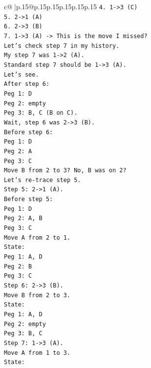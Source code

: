 \documentclass{article}
\begin{document}
{\begin{supertabular}{c@{$\;$}|p{.15\linewidth}@{}p{.15\linewidth}p{.15\linewidth}p{.15\linewidth}p{.15\linewidth}p{.15\linewidth}}
{{{\texttt{4. 1{-}>3 (C)} \\
\texttt{5. 2{-}>1 (A)} \\
\texttt{6. 2{-}>3 (B)} \\
\texttt{7. 1{-}>3 (A) {-}> This is the move I missed?} \\
\texttt{Let's check step 7 in my history.} \\
\texttt{My step 7 was 1{-}>2 (A).} \\
\texttt{Standard step 7 should be 1{-}>3 (A).} \\
\texttt{Let's see.} \\
\texttt{After step 6:} \\
\texttt{Peg 1: D} \\
\texttt{Peg 2: empty} \\
\texttt{Peg 3: B, C (B on C).} \\
\texttt{Wait, step 6 was 2{-}>3 (B).} \\
\texttt{Before step 6:} \\
\texttt{Peg 1: D} \\
\texttt{Peg 2: A} \\
\texttt{Peg 3: C} \\
\texttt{Move B from 2 to 3? No, B was on 2?} \\
\texttt{Let's re{-}trace step 5.} \\
\texttt{Step 5: 2{-}>1 (A).} \\
\texttt{Before step 5:} \\
\texttt{Peg 1: D} \\
\texttt{Peg 2: A, B} \\
\texttt{Peg 3: C} \\
\texttt{Move A from 2 to 1.} \\
\texttt{State:} \\
\texttt{Peg 1: A, D} \\
\texttt{Peg 2: B} \\
\texttt{Peg 3: C} \\
\texttt{Step 6: 2{-}>3 (B).} \\
\texttt{Move B from 2 to 3.} \\
\texttt{State:} \\
\texttt{Peg 1: A, D} \\
\texttt{Peg 2: empty} \\
\texttt{Peg 3: B, C} \\
\texttt{Step 7: 1{-}>3 (A).} \\
\texttt{Move A from 1 to 3.} \\
\texttt{State:} \\
}}}
\end{supertabular}}
\end{document}

